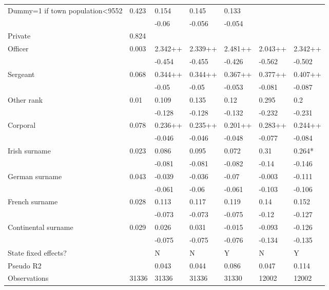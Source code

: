 \documentclass[a4paper]{report}\usepackage{graphicx, color}
\begin{document}
\begin{refsection}
\begin{table}
\begin{tabular}{lllllll}
Dummy=1 if town population<9552                  & 0.423   & 0.154   & 0.145   & 0.133   &                                     &  \\
                                                 &         & -0.06   & -0.056  & -0.054  &                                     &  \\
Private                                          & 0.824   &         &         &         &                                     &  \\
Officer & 0.003 & 2.342++ & 2.339++ & 2.481++ & 2.043++ & 2.342++ \\
        &       & -0.454  & -0.455  & -0.426  & -0.562  & -0.502  \\
Sergeant             & 0.068 & 0.344++ & 0.344++ & 0.367++ & 0.377++ & 0.407++ \\
                     &       & -0.05   & -0.05   & -0.053  & -0.081  & -0.087  \\
Other rank           & 0.01  & 0.109   & 0.135   & 0.12    & 0.295   & 0.2     \\
                     &       & -0.128  & -0.128  & -0.132  & -0.232  & -0.231  \\
Corporal             & 0.078 & 0.236++ & 0.235++ & 0.201++ & 0.283++ & 0.244++ \\
                     &       & -0.046  & -0.046  & -0.048  & -0.077  & -0.084  \\
Irish surname        & 0.023 & 0.086   & 0.095   & 0.072   & 0.31    & 0.264*  \\
                     &       & -0.081  & -0.081  & -0.082  & -0.14   & -0.146  \\
German surname       & 0.043 & -0.039  & -0.036  & -0.07   & -0.003  & -0.111  \\
                     &       & -0.061  & -0.06   & -0.061  & -0.103  & -0.106  \\
French surname       & 0.028 & 0.113   & 0.117   & 0.119   & 0.14    & 0.152   \\
                     &       & -0.073  & -0.073  & -0.075  & -0.12   & -0.127  \\
Continental surname  & 0.029 & 0.026   & 0.031   & -0.015  & -0.093  & -0.126  \\
                     &       & -0.075  & -0.075  & -0.076  & -0.134  & -0.135  \\
State fixed effects? &       & N       & N       & Y       & N       & Y       \\
Pseudo R2            &       & 0.043   & 0.044   & 0.086   & 0.047   & 0.114   \\
Observations         & 31336 & 31336   & 31336   & 31330   & 12002   & 12002   \\
\end{tabular}
\end{table}


\end{refsection}
\end{document}
